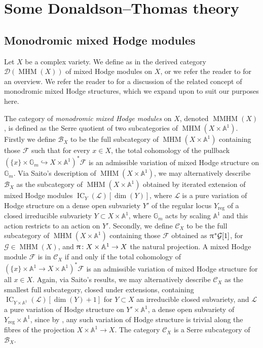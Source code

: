 \documentclass[a4paper,10pt]{amsart}
\renewcommand{\pi}{\uppi\hspace{0.05em}}
\DeclareMathOperator{\reg}{reg}
\DeclareMathOperator{\MMHM}{MMHM}
\DeclareMathOperator{\MHM}{MHM}
\DeclareMathOperator{\IC}{IC}
\newcommand{\Dub}{\mathcal{D}}
\begin{document}
\section{Some Donaldson--Thomas theory}
\subsection{Monodromic mixed Hodge modules}\label{MMHMSec}
Let $X$ be a complex variety.   We define as in \cite{Saito89,Sai90} the derived category $\Dub(\MHM(X))$ of mixed Hodge modules on $X$, or we refer the reader to \cite{Sai89} for an overview.  We refer the reader to \cite[Sec.4, Sec.7]{COHA} for a discussion of the related concept of monodromic mixed Hodge structures, which we expand upon to suit our purposes here.

The category of \textit{monodromic mixed Hodge modules} on $X$, denoted $\MMHM(X)$, is defined as the Serre quotient of two subcategories of $\MHM(X\times\mathbb{A}^1)$.  Firstly we define $\mathcal{B}_X$ to be the full subcategory of $\MHM(X\times\mathbb{A}^1)$ containing those $\mathcal{F}$ such that for every $x\in X$, the total cohomology of the pullback $(\{x\}\times\mathbb{G}_m\hookrightarrow X\times\mathbb{A}^1)^*\mathcal{F}$ is an admissible variation of mixed Hodge structure on $\mathbb{G}_m$.  Via Saito's description of $\MHM(X\times\mathbb{A}^1)$, we may alternatively describe $\mathcal{B}_X$ as the subcategory of $\MHM(X\times\mathbb{A}^1)$ obtained by iterated extension of mixed Hodge modules $\IC_Y(\mathcal{L})[\dim(Y)]$, where $\mathcal{L}$ is a pure variation of Hodge structure on a dense open subvariety $Y'$ of the regular locus $Y_{\reg}$ of a closed irreducible subvariety $Y\subset X\times\mathbb{A}^1$, where $\mathbb{G}_m$ acts by scaling $\mathbb{A}^1$ and this action restricts to an action on $Y'$.  Secondly, we define $\mathcal{C}_X$ to be the full subcategory of $\MHM(X\times\mathbb{A}^1)$ containing those $\mathcal{F}$ obtained as $\pi^*\mathcal{G}[1]$, for $\mathcal{G}\in\MHM(X)$, and $\pi\colon X\times\mathbb{A}^1\rightarrow X$ the natural projection.  A mixed Hodge module $\mathcal{F}$ is in $\mathcal{C}_X$ if and only if the total cohomology of $(\{x\}\times\mathbb{A}^1\rightarrow X\times\mathbb{A}^1)^*\mathcal{F}$ is an admissible variation of mixed Hodge structure for all $x\in X$.  Again, via Saito's results, we may alternatively describe $\mathcal{C}_X$ as the smallest full subcategory, closed under extensions, containing $\IC_{Y\times \mathbb{A}^1}(\mathcal{L})[\dim(Y)+1]$ for $Y\subset X$ an irreducible closed subvariety, and $\mathcal{L}$ a pure variation of Hodge structure on $Y'\times \mathbb{A}^1$, a dense open subvariety of $Y_{\reg}\times\mathbb{A}^1$, since by \cite{StZu85}, any such variation of Hodge structure is trivial along the fibres of the projection $X\times\mathbb{A}^1\rightarrow X$.  The category $\mathcal{C}_X$ is a Serre subcategory of $\mathcal{B}_X$.  
\end{document}
